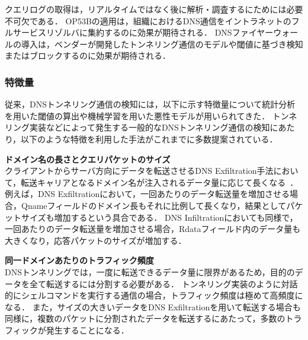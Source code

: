 クエリログの取得は，リアルタイムではなく後に解析・調査するにためには必要不可欠である．
OP53Bの適用は，組織におけるDNS通信をイントラネットのフルサービスリゾルバに集約するのに効果が期待される．
DNSファイヤーウォールの導入は，ベンダーが開発したトンネリング通信のモデルや閾値に基づき検知またはブロックするのに効果が期待される．

\subsubsection{特徴量}
\label{sec:pre-tunnel-feature}
従来，DNSトンネリング通信の検知には，以下に示す特徴量について統計分析を用いた閾値の算出や機械学習を用いた悪性モデルが用いられてきた．
トンネリング実装などによって発生する一般的なDNSトンネリング通信の検知にあたり，以下のような特徴を利用した手法がこれまでに多数提案されている．\newline


\hspace{-12pt}\textbf{ドメイン名の長さとクエリパケットのサイズ}\\
\hspace{12pt}クライアントからサーバ方向にデータを転送させるDNS Exfiltration手法において，転送キャリアとなるドメイン名が注入されるデータ量に応じて長くなる~\cite{vern}．
例えば，DNS Exfiltrationにおいて，一回あたりのデータ転送量を増加させる場合，Qnameフィールドのドメイン長もそれに比例して長くなり，結果としてパケットサイズも増加するという具合である．
DNS Infiltrationにおいても同様で，一回あたりのデータ転送量を増加させる場合，Rdataフィールド内のデータ量も大きくなり，応答パケットのサイズが増加する．



\hspace{-12pt}\textbf{同一ドメインあたりのトラフィック頻度}\\
\hspace{12pt}DNSトンネリングでは，一度に転送できるデータ量に限界があるため，目的のデータを全て転送するには分割する必要がある．
トンネリング実装のように対話的にシェルコマンドを実行する通信の場合，トラフィック頻度は極めて高頻度になる．
また，サイズの大きいデータをDNS Exfiltrationを用いて転送する場合も同様に，複数のパケットに分割されたデータを転送するにあたって，多数のトラフィックが発生することになる．\newline

